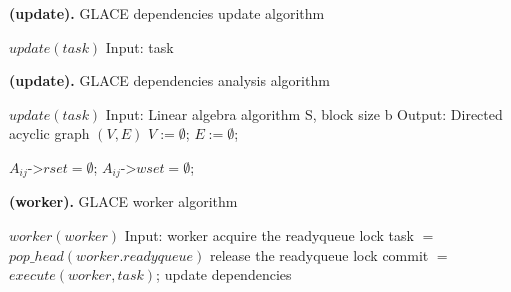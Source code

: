 \documentclass[preprint,11pt]{elsarticle}
\begin{document}
\begin{algorithm}
\caption{{\bf (update).} GLACE dependencies update algorithm}
\label{alg:update}
{\footnotesize
\begin{algorithmic} [1]
\STATE $update(task)$
\STATE Input: task
\STATE
\end{algorithmic}
}
\end{algorithm}


\begin{algorithm}
\caption{{\bf (update).} GLACE dependencies analysis algorithm}
\label{alg:update}
{\footnotesize
\begin{algorithmic} [1]
\STATE $update(task)$
\STATE Input: Linear algebra algorithm S, block size b
\STATE Output: Directed acyclic graph $(V, E)$
\STATE $V :=  \emptyset$; $E := \emptyset$;

      \STATE $A_{ij} \texttt{->} rset = \emptyset$; $A_{ij} \texttt{->} wset = \emptyset$;
    \ENDFOR
  \ENDFOR
\ENDFOR


	    \ENDIF
      \ENDFOR
    \ENDIF
  \ENDFOR

	    \ENDIF
       \ENDFOR
    \ENDIF 
  \ENDFOR

\ENDFOR


\end{algorithmic}
}
\end{algorithm}




\begin{algorithm}
\caption{{\bf (worker).} GLACE worker algorithm}
\label{alg:worker}
{\footnotesize
\begin{algorithmic} [1]
\STATE $worker(worker)$
\STATE Input: worker
  \STATE acquire the readyqueue lock
  \STATE task $=$ $pop\_head(worker.readyqueue)$
  \STATE release the readyqueue lock
    \STATE commit $=$ $execute(worker, task)$;
      \STATE update dependencies
    \ENDIF
  \ENDIF
\ENDWHILE
\end{algorithmic}
}
\end{algorithm}

\end{document}
